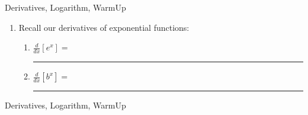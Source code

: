 \begin{tagblock}{Derivatives, Logarithm, WarmUp}
\begin{question}
\begin{enumerate}
\begin{enumerate}
\begin{enumerate}
\vspace{1.5in}

\end{enumerate}  

\item Recall our derivatives of exponential functions:
\begin{enumerate}

\item $\frac{d}{dx} [e^x] = $ \rule[-0.1cm]{2.5cm}{0.01cm} 

\vspace{.5in}

\item $\frac{d}{dx} [b^x] =$ \rule[-0.1cm]{2.5cm}{0.01cm}


\end{enumerate}  

\end{enumerate}

\end{enumerate}



	
\begin{tags}
	   Derivatives, Logarithm, WarmUp
\end{tags}
	
\begin{diary}
\end{diary}
	
\begin{solution}
	   
\end{solution}
	
\end{question}

\end{tagblock}



